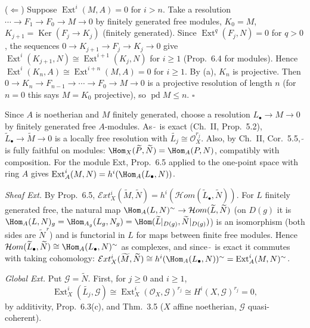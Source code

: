 \documentclass[11pt]{article}
\begin{document}
($\Leftarrow$) Suppose $\operatorname{Ext}^i(M,A)=0$ for $i>n$. Take a resolution $\cdots\to F_1\to F_0\to M\to0$ by finitely generated free modules, $K_0=M$, $K_{j+1}=\operatorname{Ker}(F_j\to K_j)$ (finitely generated). Since $\operatorname{Ext}^q(F_j,N)=0$ for $q>0$, the sequences $0\to K_{j+1}\to F_j\to K_j\to0$ give $\operatorname{Ext}^i(K_{j+1},N)\cong\operatorname{Ext}^{i+1}(K_j,N)$ for $i\ge1$ (Prop.~6.4 for modules). Hence $\operatorname{Ext}^i(K_n,A)\cong\operatorname{Ext}^{i+n}(M,A)=0$ for $i\ge1$. By (a), $K_n$ is projective. Then $0\to K_n\to F_{n-1}\to\cdots\to F_0\to M\to0$ is a projective resolution of length $n$ (for $n=0$ this says $M=K_0$ projective), so $\operatorname{pd}M\le n$. \hfill$\square$

\pf
Since $A$ is noetherian and $M$ finitely generated, choose a resolution $L_\bullet\to M\to0$ by finitely generated free $A$-modules. As $\widetilde{\ }$ is exact (Ch.~II, Prop.~5.2), $\widetilde{L}_\bullet\to\widetilde M\to0$ is a locally free resolution with $\widetilde{L_j}\cong\mathcal O_X^{r_j}$. Also, by Ch.~II, Cor.~5.5, $\widetilde{\ }$ is fully faithful on modules: $\Hom_X(\widetilde P,\widetilde N)=\Hom_A(P,N)$, compatibly with composition. For the module Ext, Prop.~6.5 applied to the one-point space with ring $A$ gives $\operatorname{Ext}^i_A(M,N)=h^i(\Hom_A(L_\bullet,N))$.

\emph{Sheaf Ext.} By Prop.~6.5, $\mathcal{E}xt^i_X(\widetilde M,\widetilde N)=h^i(\mathcal{H}om(\widetilde L_\bullet,\widetilde N))$. For $L$ finitely generated free, the natural map $\Hom_A(L,N)^\sim\to\mathcal{H}om(\widetilde L,\widetilde N)$ (on $D(g)$ it is $\Hom_A(L,N)_g=\Hom_{A_g}(L_g,N_g)=\Hom(\widetilde L|_{D(g)},\widetilde N|_{D(g)})$) is an isomorphism (both sides are $\widetilde N^{\,r}$) and is functorial in $L$ for maps between finite free modules. Hence $\mathcal{H}om(\widetilde L_\bullet,\widetilde N)\cong\Hom_A(L_\bullet,N)^\sim$ as complexes, and since $\widetilde{\ }$ is exact it commutes with taking cohomology: $\mathcal{E}xt^i_X(\widetilde M,\widetilde N)\cong h^i(\Hom_A(L_\bullet,N))^\sim=\operatorname{Ext}^i_A(M,N)^\sim$.

\emph{Global Ext.} Put $\mathcal G=\widetilde N$. First, for $j\ge0$ and $i\ge1$,
\[
\operatorname{Ext}^i_X(\widetilde{L_j},\mathcal G)\cong\operatorname{Ext}^i_X(\mathcal O_X,\mathcal G)^{r_j}\cong H^i(X,\mathcal G)^{r_j}=0,\tag{1}
\]
by additivity, Prop.~6.3(c), and Thm.~3.5 ($X$ affine noetherian, $\mathcal G$ quasi-coherent).
\end{document}
